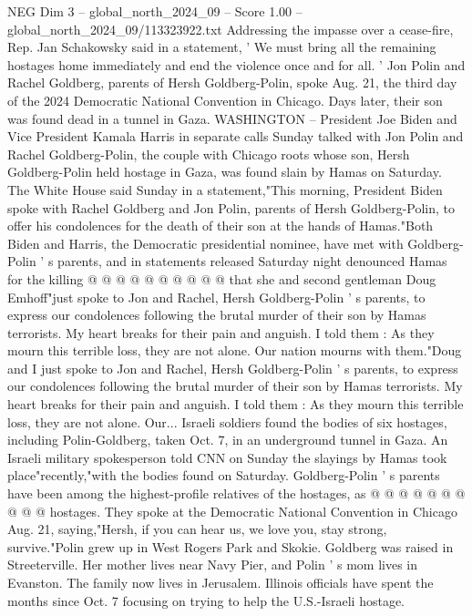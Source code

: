 \begin{textsample}{NEG Dim 3 – global\_north\_2024\_09 – Score 1.00 – global\_north\_2024\_09/113323922.txt}  \label{ex:f3_neg_297}
Addressing the impasse over a cease-fire, Rep.
Jan Schakowsky said in a statement, ' We must bring all the remaining hostages home immediately and end the violence once and for all. ' Jon Polin and Rachel Goldberg, parents of Hersh Goldberg-Polin, spoke Aug. 21, the third day of the 2024 Democratic National Convention in Chicago.
Days later, their son was found dead in a tunnel in Gaza.
WASHINGTON -- President Joe Biden and Vice President Kamala Harris in separate calls Sunday talked with Jon Polin and Rachel Goldberg-Polin, the couple with Chicago roots whose son, Hersh Goldberg-Polin held hostage in Gaza, was found slain by Hamas on Saturday.
The White House said Sunday in a statement,"This morning, President Biden spoke with Rachel Goldberg and Jon Polin, parents of Hersh Goldberg-Polin, to offer his condolences for the death of their son at the hands of Hamas."Both Biden and Harris, the Democratic presidential nominee, have met with Goldberg-Polin ' s parents, and in statements released Saturday night denounced Hamas for the killing @ @ @ @ @ @ @ @ @ @ that she and second gentleman Doug Emhoff"just spoke to Jon and Rachel, Hersh Goldberg-Polin ' s parents, to express our condolences following the brutal murder of their son by Hamas terrorists.
My heart breaks for their pain and anguish.
I told them : As they mourn this terrible loss, they are not alone.
Our nation mourns with them."Doug and I just spoke to Jon and Rachel, Hersh Goldberg-Polin ' s parents, to express our condolences following the brutal murder of their son by Hamas terrorists.
My heart breaks for their pain and anguish.
I told them : As they mourn this terrible loss, they are not alone.
Our...
Israeli soldiers found the bodies of six hostages, including Polin-Goldberg, taken Oct. 7, in an underground tunnel in Gaza.
An Israeli military spokesperson told CNN on Sunday the slayings by Hamas took place"recently,"with the bodies found on Saturday.
Goldberg-Polin ' s parents have been among the highest-profile relatives of the hostages, as @ @ @ @ @ @ @ @ @ @ hostages.
They spoke at the Democratic National Convention in Chicago Aug. 21, saying,"Hersh, if you can hear us, we love you, stay strong, survive."Polin grew up in West Rogers Park and Skokie.
Goldberg was raised in Streeterville.
Her mother lives near Navy Pier, and Polin ' s mom lives in Evanston.
The family now lives in Jerusalem.
Illinois officials have spent the months since Oct. 7 focusing on trying to help the U.S.-Israeli hostage.

\end{textsample}
